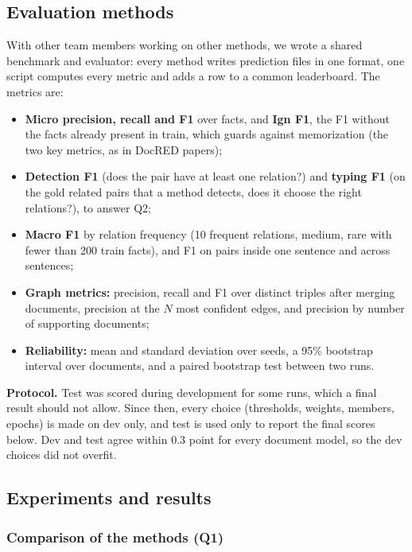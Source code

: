 \documentclass[pdflatex,sn-mathphys-num]{sn-jnl}
\begin{document}
\subsection{Evaluation methods}\label{sec:evaluation}

With other team members working on other methods, we wrote a shared benchmark and evaluator: every method writes prediction files in one format, one script computes every metric and adds a row to a common leaderboard. The metrics are:

\begin{itemize}
\item \textbf{Micro precision, recall and F1} over facts, and \textbf{Ign F1}, the F1 without the facts already present in train, which guards against memorization (the two key metrics, as in DocRED papers);
\item \textbf{Detection F1} (does the pair have at least one relation?) and \textbf{typing F1} (on the gold related pairs that a method detects, does it choose the right relations?), to answer Q2;
\item \textbf{Macro F1} by relation frequency (10 frequent relations, medium, rare with fewer than 200 train facts), and F1 on pairs inside one sentence and across sentences;
\item \textbf{Graph metrics:} precision, recall and F1 over distinct triples after merging documents, precision at the $N$ most confident edges, and precision by number of supporting documents;
\item \textbf{Reliability:} mean and standard deviation over seeds, a 95\% bootstrap interval over documents, and a paired bootstrap test between two runs.
\end{itemize}

\textbf{Protocol.} Test was scored during development for some runs, which a final result should not allow. Since then, every choice (thresholds, weights, members, epochs) is made on dev only, and test is used only to report the final scores below. Dev and test agree within 0.3 point for every document model, so the dev choices did not overfit.

\subsection{Experiments and results}\label{sec:results}

\subsubsection{Comparison of the methods (Q1)}
\end{document}
